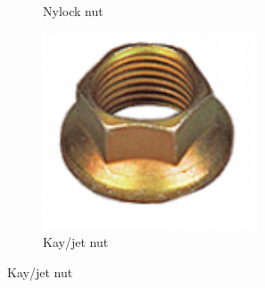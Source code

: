 \begin{figure}[H]
\begin{subfigure}[b]{.24\linewidth}
			\caption{Nylock nut}
		\end{subfigure}\begin{subfigure}[b]{.24\linewidth}
			\includegraphics[width=0.7\textwidth]{imgs/kaynut.png}
			\caption{Kay/jet nut}
		\end{subfigure}
		

\end{figure}
